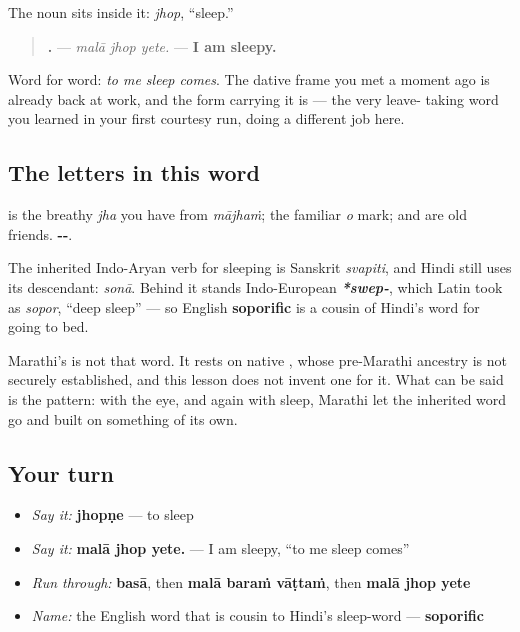 The noun sits inside it: \textbf{} \emph{jhop}, \textquotedblleft{}sleep.\textquotedblright{}

\begin{quote}
\textbf{  .} — \emph{malā jhop yete.} — \textbf{I am sleepy.}
\end{quote}

Word for word: \emph{to me sleep comes}. The dative frame you met a moment ago is already back at work, and the form carrying it is \textbf{} — the very leave- taking word you learned in your first courtesy run, doing a different job here.

\subsection*{The letters in this word}
\textbf{} is the breathy \emph{jha} you have from \emph{mājhaṁ}; \textbf{} the familiar \emph{o} mark; \textbf{} and \textbf{} are old friends. \textbf{--}.

\begin{cousinweb}
The inherited Indo-Aryan verb for sleeping is Sanskrit \textbf{} \emph{svapiti}, and Hindi still uses its descendant: \textbf{} \emph{sonā}. Behind it stands Indo-European \emph{\textbf{*swep-}}, which Latin took as \emph{sopor}, \textquotedblleft{}deep sleep\textquotedblright{} — so English \textbf{soporific} is a cousin of Hindi's word for going to bed.

Marathi's \textbf{} is not that word. It rests on native \textbf{}, whose pre-Marathi ancestry is not securely established, and this lesson does not invent one for it. What can be said is the pattern: with the eye, and again with sleep, Marathi let the inherited word go and built on something of its own.
\end{cousinweb}

\subsection*{Your turn}
\begin{itemize}
\raggedright
  \item \emph{Say it:} \textbf{jhopṇe} — to sleep
  \item \emph{Say it:} \textbf{malā jhop yete.} — I am sleepy, \textquotedblleft{}to me sleep comes\textquotedblright{}
  \item \emph{Run through:} \textbf{basā}, then \textbf{malā baraṁ vāṭtaṁ}, then \textbf{malā jhop yete}
  \item \emph{Name:} the English word that is cousin to Hindi's sleep-word — \textbf{soporific}
\end{itemize}

